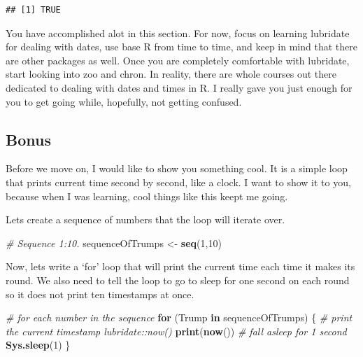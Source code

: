 \documentclass[]{book}
\newenvironment{Shaded}{\begin{snugshade}}{\end{snugshade}}
\newcommand{\CommentTok}[1]{\textcolor[rgb]{0.56,0.35,0.01}{\textit{#1}}}
\newcommand{\ControlFlowTok}[1]{\textcolor[rgb]{0.13,0.29,0.53}{\textbf{#1}}}
\newcommand{\DecValTok}[1]{\textcolor[rgb]{0.00,0.00,0.81}{#1}}
\newcommand{\KeywordTok}[1]{\textcolor[rgb]{0.13,0.29,0.53}{\textbf{#1}}}
\newcommand{\NormalTok}[1]{#1}
\newcommand{\StringTok}[1]{\textcolor[rgb]{0.31,0.60,0.02}{#1}}
\begin{document}
\begin{verbatim}
## [1] TRUE
\end{verbatim}

You have accomplished alot in this section. For now, focus on learning lubridate for dealing with dates, use base R from time to time, and keep in mind that there are other packages as well. Once you are completely comfortable with lubridate, start looking into zoo and chron. In reality, there are whole courses out there dedicated to dealing with dates and times in R. I really gave you just enough for you to get going while, hopefully, not getting confused.

\hypertarget{bonus}{%
\subsection{Bonus}\label{bonus}}

Before we move on, I would like to show you something cool. It is a simple loop that prints current time second by second, like a clock. I want to show it to you, because when I was learning, cool things like this keept me going.

Lets create a sequence of numbers that the loop will iterate over.

\begin{Shaded}
\begin{Highlighting}[]
\CommentTok{# Sequence 1:10.}
\NormalTok{sequenceOfTrumps <-}\StringTok{ }\KeywordTok{seq}\NormalTok{(}\DecValTok{1}\NormalTok{,}\DecValTok{10}\NormalTok{)}
\end{Highlighting}
\end{Shaded}

Now, lets write a `for' loop that will print the current time each time it makes its round. We also need to tell the loop to go to sleep for one second on each round so it does not print ten timestamps at once.

\begin{Shaded}
\begin{Highlighting}[]
\CommentTok{# for each number in the sequence}
\ControlFlowTok{for}\NormalTok{ (Trump }\ControlFlowTok{in}\NormalTok{ sequenceOfTrumps) \{ }
\CommentTok{# print the current timestamp lubridate::now()  }
  \KeywordTok{print}\NormalTok{(}\KeywordTok{now}\NormalTok{()) }
\CommentTok{# fall asleep for 1 second }
  \KeywordTok{Sys.sleep}\NormalTok{(}\DecValTok{1}\NormalTok{) }
\NormalTok{\}}
\end{Highlighting}
\end{Shaded}
\end{document}
